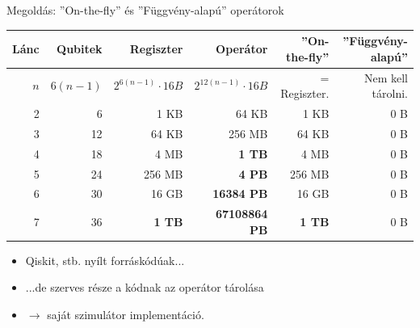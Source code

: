 \documentclass[aspectratio=169]{beamer}
\begin{document}
\begin{frame}[t]{Megoldás: ''On-the-fly'' és ''Függvény-alapú'' operátorok}
\vspace{2mm}
\begin{tabular}{r|r|r|r|r|r}
Lánc & Qubitek & Regiszter & Operátor &  \cellcolor{applegreen!30} ''On-the-fly'' &  \cellcolor{applegreen!30} ''Függvény-alapú'' \\
\hline
\rule{0pt}{1.05\normalbaselineskip} $n$ & $6(n-1)$ & $2^{6(n-1)} \cdot{} 16 B$ & ${2^{12(n-1)}} \cdot{} 16 B$ &  = Regiszter. &   Nem kell tárolni. \\
\hline
2 & 6 &  1 KB &  64 KB &  1 KB & 0 B \\
3 & 12 &  64 KB &  256 MB &  64 KB & 0 B \\
4 & 18 &  4 MB & \color{red} \textbf{1 TB} &  4 MB & 0 B  \\
5 & 24 &  256 MB & \color{red} \textbf{4 PB} &  256 MB & 0 B \\
6 & 30 &  16 GB & \color{red} \textbf{16384 PB} &  16 GB & 0 B\\
7 & 36 & \color{red} \textbf{1 TB} & \color{red} \textbf{67108864 PB} & \color{red} \textbf{1 TB} & 0 B
\end{tabular}
\pause
\vspace{2mm}
\begin{itemize}
    \item Qiskit, stb. nyílt forráskódúak...
    \item ...de szerves része a kódnak az operátor tárolása
    \item $\rightarrow$ saját szimulátor implementáció.
\end{itemize}

\end{frame}
\end{document}
